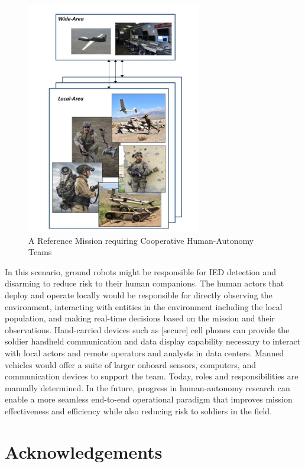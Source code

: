\documentclass[11pt]{article}
\begin{document}
\begin{figure}[h]
   \centering
   \includegraphics[height=4in]{reference-mission.jpg} 
   \caption{A Reference Mission requiring Cooperative Human-Autonomy Teams}
   \label{fig:ref-mission}
\end{figure}

In this scenario, ground robots might be responsible for IED detection and disarming to reduce risk to
their human companions.  The human actors that deploy and operate locally would be responsible
for directly observing the environment, interacting with entities in the environment including the local population, and
making real-time decisions based on the mission and their observations.  Hand-carried devices such as [secure] cell phones
can provide the soldier handheld communication and data display capability necessary to interact with local actors and remote operators and analysts in data centers.  Manned vehicles would offer a suite of larger onboard sensors, computers, and communication devices to support the team.  Today, roles and responsibilities are manually determined.  In the future, progress in human-autonomy research can enable a more seamless end-to-end operational paradigm that improves mission effectiveness and efficiency while also reducing risk to soldiers in the field.  








\section*{Acknowledgements}
\end{document}
